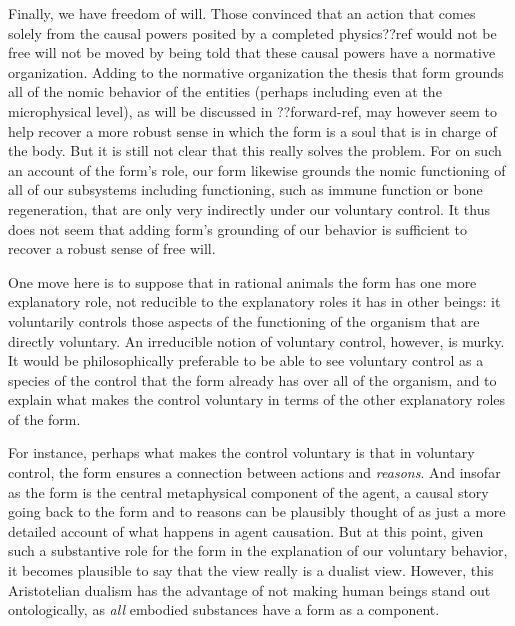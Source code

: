 Finally, we have freedom of will. Those convinced that an action that comes solely from the causal powers posited by a completed
physics??ref would not be free will not be moved by being told that these causal powers have a normative organization. 
Adding to the normative organization the thesis that form grounds all of the nomic behavior of the entities (perhaps including 
even at the microphysical level), as will be discussed in ??forward-ref, may however seem to help recover a more robust sense in which the form is a soul that is in 
charge of the body. But it is still not clear that this really solves the problem. For on such an account
of the form's role, our form likewise grounds 
the nomic functioning of all of our subsystems including functioning, such as immune function or bone regeneration, that are 
only very indirectly under our voluntary control. It thus does not seem that adding form's grounding of our behavior is 
sufficient to recover a robust sense of free will.

One move here is to suppose that in rational animals the form has one more explanatory role, not reducible to the explanatory
roles it has in other beings: it voluntarily controls those aspects of the functioning of the organism that are directly
voluntary. An irreducible notion of voluntary control, however, is murky. It would be philosophically preferable to be able to see 
voluntary control as a species of the control that the form already has over all of the organism, and to explain what makes the 
control voluntary in terms of the other explanatory roles of the form. 

For instance, perhaps what makes the control voluntary is that in voluntary control, the form ensures a connection between
actions and \textit{reasons}. And insofar as the form is the central metaphysical component of the agent, a causal story 
going back to the form and to reasons can be plausibly thought of as just a more detailed account of what happens in 
agent causation. But at this point, given such a substantive role for the form in the explanation of our voluntary
behavior, it becomes plausible to say that the view really is a dualist view. However, this Aristotelian dualism
has the advantage of not making human beings stand out ontologically, as \textit{all} embodied substances
have a form as a component.

